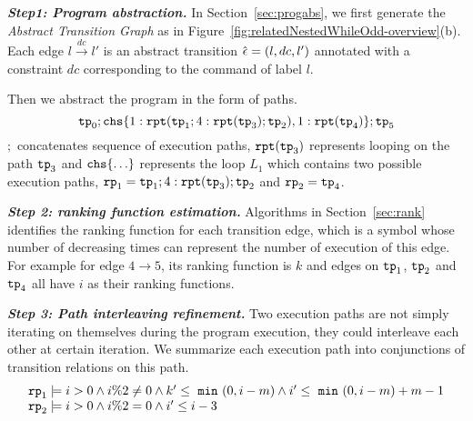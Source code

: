 
\textbf{\emph{Step1: Program abstraction.}}
In Section~\ref{sec:progabs},
we first 
generate the \emph{Abstract Transition Graph} as in Figure~\ref{fig:relatedNestedWhileOdd-overview}(b).
Each edge $l \xrightarrow{dc} l'$ is an abstract transition $\hat{\mathtt{\epsilon}{}} = (l, dc, l')$ annotated with a constraint $dc$ corresponding to the command of label $l$.

Then we abstract the program in the form of paths.
$$
\tpath_0 ; \rpchoose{ 1: \rprepeat(\tpath_1; 4:\rprepeat(\tpath_3); \tpath_2), 1:\rprepeat(\tpath_4) }; \tpath_5
$$
$;$ concatenates sequence of execution paths,
$\mathtt{rpt}(\mathtt{tp}_3)$ represents looping on the path $\mathtt{tp}_3$ and
$\rpchoose{ \ldots}$ represents the loop $L_1$ which contains two possible execution paths,
$\mathtt{rp}_1 = \mathtt{tp}_1; 4:\mathtt{rpt}(\mathtt{tp}_3);\mathtt{tp}_2$ and $\mathtt{rp}_2 =\mathtt{tp}_4$.

\textbf{\emph{Step 2: ranking function estimation.}}
Algorithms in Section~\ref{sec:rank} identifies the ranking function for each transition edge, which is a symbol whose number of decreasing times can represent the number of execution of this edge.
For example for edge $4 \to 5$, its ranking function is $k$ and edges on $\mathtt{tp}_1$, $\mathtt{tp}_2$ and $\mathtt{tp}_4$ all have $i$ as their ranking functions.


\textbf{\emph{Step 3: Path interleaving refinement.}} 
Two execution paths are not simply iterating on themselves during the program execution,
they could interleave each other at certain iteration.
We summarize each execution path into conjunctions of transition relations on this path.
\begin{equation}
    \begin{array}{l}
        \mathtt{rp}_1 \models i > 0 \land  i \%2 \neq 0 \land k' \leq ~\mathtt{min}~(0, i - m) 
        \land i' \leq ~\mathtt{min}~(0, i - m) + m - 1\\
    \mathtt{rp}_2 \models i > 0 \land i \%2 = 0 \land  i' \leq i - 3
    \end{array}
\end{equation}

